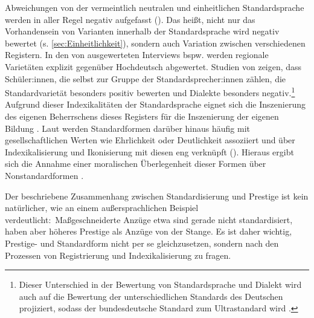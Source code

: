 Abweichungen von der vermeintlich neutralen und einheitlichen Standardsprache werden in aller Regel negativ aufgefasst (\cites[s.][522]{Harnisch.2005}[136]{Silverstein.2017}).
Das heißt, nicht nur das Vorhandensein von Varianten innerhalb der Standardsprache wird negativ bewertet (s. \autoref{sec:Einheitlichkeit}), sondern auch Variation zwischen verschiedenen Registern.  
In den von \citet[]{Beuge2017} ausgewerteten Interviews bspw. werden regionale Varietäten explizit gegenüber \glqq Hochdeutsch\grqq{} abgewertet. 
Studien von \citet{Schmid.1973} zeigen, dass Sch{\"u}ler:innen, die selbst zur Gruppe der Standardsprecher:innen z{\"a}hlen, die Standardvarietät besonders positiv bewerten und Dialekte besonders negativ.\footnote{Dieser Unterschied in der Bewertung von Standardsprache und Dialekt wird auch auf die Bewertung der unterschiedlichen Standards des Deutschen projiziert, sodass der bundesdeutsche Standard zum {\glqq}Ultrastandard{\grqq} wird \citep[s.][32]{Auer.2013}.} 
Aufgrund dieser Indexikalitäten der Standardsprache eignet sich die Inszenierung des eigenen Beherrschens dieses Registers für die Inszenierung der eigenen Bildung \citep[s.][108]{Arendt2015}. 
Laut \citet[64]{Woolard1994} werden Standardformen darüber hinaus häufig mit gesellschaftlichen Werten wie Ehrlichkeit oder Deutlichkeit assoziiert und über Indexikalisierung und Ikonisierung mit diesen eng verknüpft (\cites[s.][239]{Silverstein.1985}[141]{Silverstein.2017}). 
Hieraus ergibt sich die Annahme einer moralischen Überlegenheit dieser Formen über Nonstandardformen \citep[s.][21]{Woolard1998}. 

Der beschriebene Zusammenhang zwischen Standardisierung und Prestige ist kein natürlicher, wie \citet[532--533]{Milroy2001} an einem au{\ss}ersprachlichen Beispiel verdeutlicht:~Ma{\ss}geschneiderte Anz{\"u}ge etwa sind gerade nicht standardisiert, haben aber h{\"o}heres Prestige als Anz{\"u}ge {\glqq}von der Stange{\grqq}. 
Es ist daher wichtig, Prestige- und Standardform nicht per se gleichzusetzen, sondern nach den Prozessen von Registrierung und Indexikalisierung zu fragen.


